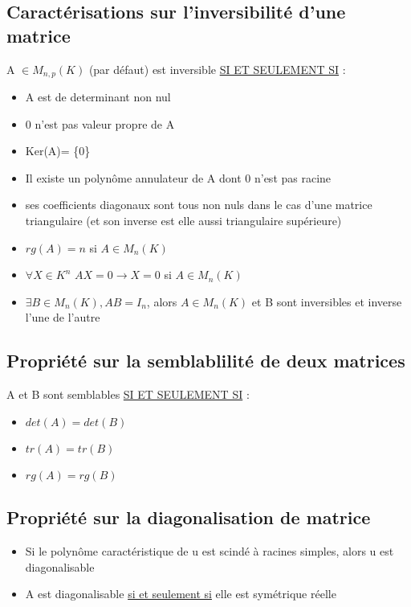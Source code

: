 \documentclass{article}
\begin{document}
\subsection{Caractérisations sur l'inversibilité d'une matrice}
A \( \in M_{n,p}(K) \) (par défaut) est inversible \underline{SI ET SEULEMENT SI} : 
\begin{itemize}[label=$\ast$]
	\item A est de determinant non nul
	\item 0 n'est pas valeur propre de A
	\item Ker(A)= \{0\}
	\item Il existe un polynôme annulateur de A dont 0 n'est pas racine
	\item ses coefficients diagonaux sont tous non nuls dans le cas d'une matrice triangulaire (et son inverse est elle aussi triangulaire supérieure)
	\item \(rg(A) = n\) si \(A \in M_n(K)\)
	\item \( \forall X \in K^n\) \(AX=0 \rightarrow X=0\) si \( A \in M_n(K) \) 
	\item \(\exists B \in M_n(K), AB = I_n\), alors \(A \in M_n(K)\) et B sont inversibles et inverse l'une de l'autre
\end{itemize}

\subsection{Propriété sur la semblablilité de deux matrices}
A et B sont semblables \underline{SI ET SEULEMENT SI} : 
\begin{itemize}[label=$\ast$]
	\item \( det(A) = det(B) \)
	\item \( tr(A) = tr(B) \)
	\item \( rg(A) = rg(B) \)
\end{itemize}

\subsection{Propriété sur la diagonalisation de matrice}
\begin{itemize}[label=$\ast$]
	\item Si le polynôme caractéristique de u est scindé à racines simples, alors u est diagonalisable
	\item A est diagonalisable \underline{si et seulement si} elle est symétrique réelle
\end{itemize}
\end{document}
